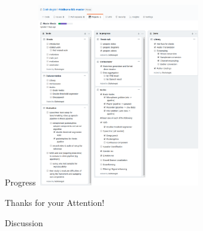 \documentclass{beamer}
\begin{document}
	\begin{frame}{Progress}
		\centering
		\includegraphics[height=8cm]{Bilder/progress}
	\end{frame}
	
	
	
	
	
	
	
	\begin{frame}{}
		\begin{alertblock}{Thanks for your Attention!}
		\end{alertblock}
	\end{frame}
	
	\begin{frame}{}
		\begin{alertblock}{Discussion}
		\end{alertblock}
	\end{frame}
	
\end{document}

